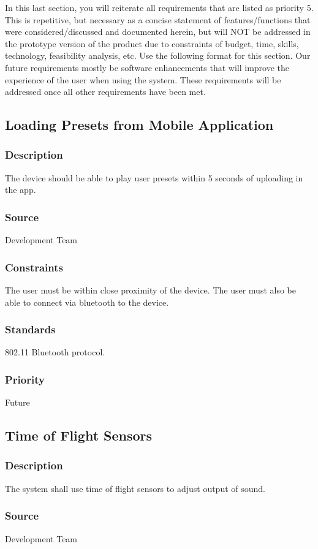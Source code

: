 In this last section, you will reiterate all requirements that are listed as priority 5. This is repetitive, but necessary as a concise statement of features/functions that were considered/discussed and documented herein, but will NOT be addressed in the prototype version of the product due to constraints of budget, time, skills, technology, feasibility analysis, etc. Use the following format for this section.
Our future requirements mostly be software enhancements that will improve the experience of the user when using the system. These requirements will be addressed once all other requirements have been met. 

\subsection{Loading Presets from Mobile Application}
\subsubsection{Description}
The device should be able to play user presets within 5 seconds of uploading in the app.
\subsubsection{Source}
Development Team
\subsubsection{Constraints}
The user must be within close proximity of the device. The user must also be able to connect via bluetooth to the device. 
\subsubsection{Standards}
802.11 Bluetooth protocol.
\subsubsection{Priority}
Future

\subsection{Time of Flight Sensors}
\subsubsection{Description}
The system shall use time of flight sensors to adjust output of sound.
\subsubsection{Source}
Development Team
